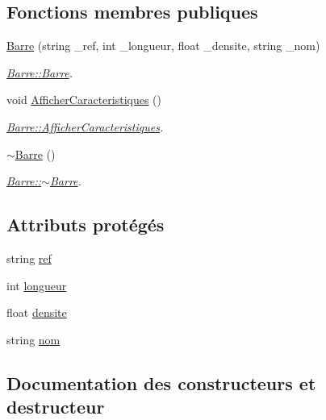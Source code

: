 \subsection*{Fonctions membres publiques}
\begin{DoxyCompactItemize}
\item 
\hyperlink{class_barre_aa47a7c516a56429545d7c63cf3a55bac}{Barre} (string \+\_\+ref, int \+\_\+longueur, float \+\_\+densite, string \+\_\+nom)
\begin{DoxyCompactList}\small\item\em \hyperlink{class_barre_aa47a7c516a56429545d7c63cf3a55bac}{Barre\+::\+Barre}. \end{DoxyCompactList}\item 
void \hyperlink{class_barre_a2e844be9d7c76a74d61cb14243a1bade}{Afficher\+Caracteristiques} ()
\begin{DoxyCompactList}\small\item\em \hyperlink{class_barre_a2e844be9d7c76a74d61cb14243a1bade}{Barre\+::\+Afficher\+Caracteristiques}. \end{DoxyCompactList}\item 
\hyperlink{class_barre_adc603c73952d56885cad1cc1acad578f}{$\sim$\+Barre} ()
\begin{DoxyCompactList}\small\item\em \hyperlink{class_barre_adc603c73952d56885cad1cc1acad578f}{Barre\+::$\sim$\+Barre}. \end{DoxyCompactList}\end{DoxyCompactItemize}
\subsection*{Attributs protégés}
\begin{DoxyCompactItemize}
\item 
string \hyperlink{class_barre_adc8a65b186d431c2c81f434d3d6973b1}{ref}
\item 
int \hyperlink{class_barre_a59f5637eaf9c15084deafab15f0de07d}{longueur}
\item 
float \hyperlink{class_barre_a1ed969f61782b23802f20ff7a5759f8d}{densite}
\item 
string \hyperlink{class_barre_a28ab665131a097ea05e175e461375362}{nom}
\end{DoxyCompactItemize}


\subsection{Documentation des constructeurs et destructeur}
\mbox{\label{class_barre_aa47a7c516a56429545d7c63cf3a55bac}} 
